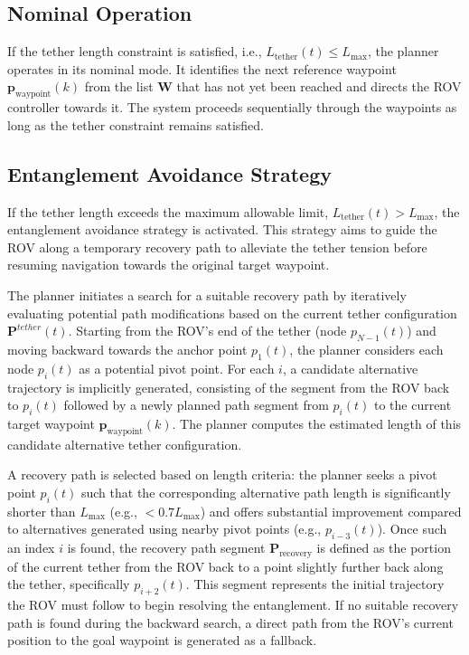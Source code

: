 \subsection{Nominal Operation}
If the tether length constraint is satisfied, i.e., \( L_{\text{tether}}(t) \leq L_{\text{max}} \), the planner operates in its nominal mode. It identifies the next reference waypoint \( \mathbf{p}_{\text{waypoint}}(k) \) from the list \( \mathbf{W} \) that has not yet been reached and directs the \ac{ROV} controller towards it. The system proceeds sequentially through the waypoints as long as the tether constraint remains satisfied.



\subsection{Entanglement Avoidance Strategy}
If the tether length exceeds the maximum allowable limit, \( L_{\text{tether}}(t) > L_{\text{max}} \), the entanglement avoidance strategy is activated. This strategy aims to guide the \ac{ROV} along a temporary recovery path to alleviate the tether tension before resuming navigation towards the original target waypoint.

The planner initiates a search for a suitable recovery path by iteratively evaluating potential path modifications based on the current tether configuration \( \mathbf{P}^{tether}(t) \). Starting from the \ac{ROV}'s end of the tether (node \( p_{N-1}(t) \)) and moving backward towards the anchor point \( p_1(t) \), the planner considers each node \( p_i(t) \) as a potential pivot point. For each \( i \), a candidate alternative trajectory is implicitly generated, consisting of the segment from the \ac{ROV} back to \( p_i(t) \) followed by a newly planned path segment from \( p_i(t) \) to the current target waypoint \( \mathbf{p}_{\text{waypoint}}(k) \). The planner computes the estimated length of this candidate alternative tether configuration.

A recovery path is selected based on length criteria: the planner seeks a pivot point \( p_i(t) \) such that the corresponding alternative path length is significantly shorter than \( L_{\text{max}} \) (e.g., \( < 0.7 L_{\text{max}} \)) and offers substantial improvement compared to alternatives generated using nearby pivot points (e.g., \( p_{i-3}(t) \)). Once such an index \( i \) is found, the recovery path segment \( \mathbf{P}_{\text{recovery}} \) is defined as the portion of the current tether from the \ac{ROV} back to a point slightly further back along the tether, specifically \( p_{i+2}(t) \). This segment represents the initial trajectory the \ac{ROV} must follow to begin resolving the entanglement. If no suitable recovery path is found during the backward search, a direct path from the \ac{ROV}'s current position to the goal waypoint is generated as a fallback.

